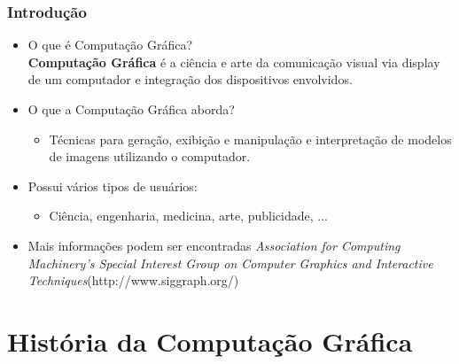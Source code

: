 \documentclass{beamer}
\begin{document}
\begin{frame}
\frametitle{Introdução}

\begin{block}


\begin{itemize}
	
	\item<1-> O que é Computação Gráfica?\\
		\textbf{Computação Gráfica} é a ciência e arte da comunicação visual via display de um computador e integração dos dispositivos envolvidos.
	\item<2-> O que a Computação Gráfica aborda?\\
		\begin{itemize}
			\item<3-> Técnicas para geração, exibição e manipulação e interpretação de modelos de imagens utilizando o computador.
		\end{itemize}
	\item<3-> Possui vários tipos de usuários:
		\begin{itemize}
			\item Ciência, engenharia, medicina, arte, publicidade, ...
		\end{itemize}
	\item<4-> Mais informações podem ser encontradas \textit{Association for Computing Machinery’s Special Interest Group on Computer Graphics and Interactive Techniques}(http://www.siggraph.org/)

\end{itemize}
\end{block}
\end{frame}



\section{História da Computação Gráfica}
\begin{frame}

\end{frame}

\end{document}
